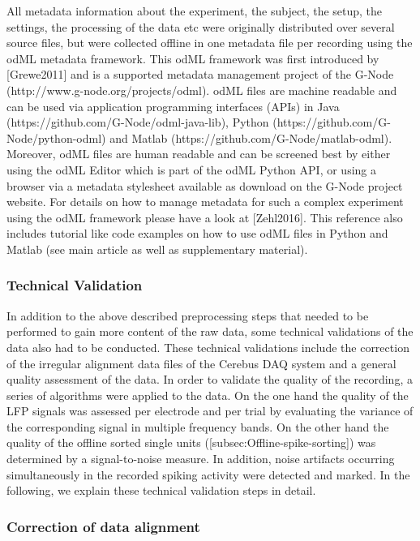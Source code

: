 { All metadata information about the experiment, the subject, the setup, the settings, the processing of the data etc were originally distributed over several source files, but were collected offline in one metadata file per recording using the odML metadata framework. This odML framework was first introduced by [Grewe2011] and is a supported metadata management project of the G-Node (http://www.g-node.org/projects/odml). odML files are machine readable and can be used via application programming interfaces (APIs) in Java (https://github.com/G-Node/odml-java-lib), Python (https://github.com/G-Node/python-odml) and Matlab (https://github.com/G-Node/matlab-odml). Moreover, odML files are human readable and can be screened best by either using the odML Editor which is part of the odML Python API, or using a browser via a metadata stylesheet available as download on the G-Node project website. For details on how to manage metadata for such a complex experiment using the odML framework please have a look at [Zehl2016]. This reference also includes tutorial like code examples on how to use odML files in Python and Matlab (see main article as well as supplementary material).

\subsubsection{Technical Validation}

In addition to the above described preprocessing steps that needed to be performed to gain more content of the raw data, some technical validations of the data also had to be conducted. These technical validations include the correction of the irregular alignment data files of the Cerebus DAQ system and a general quality assessment of the data. In order to validate the quality of the recording, a series of algorithms were applied to the data. On the one hand the quality of the LFP signals was assessed per electrode and per trial by evaluating the variance of the corresponding signal in multiple frequency bands. On the other hand the quality of the offline sorted single units ([subsec:Offline-spike-sorting]) was determined by a signal-to-noise measure. In addition, noise artifacts occurring simultaneously in the recorded spiking activity were detected and marked. In the following, we explain these technical validation steps in detail.

\subsubsection{Correction of data alignment}

}
